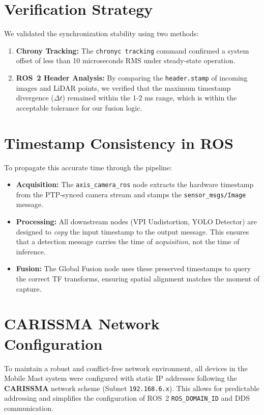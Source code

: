 \documentclass[12pt,a4paper]{report}
\begin{document}
\section{Verification Strategy}
We validated the synchronization stability using two methods:
\begin{enumerate}
    \item \textbf{Chrony Tracking:} The \texttt{chronyc tracking} command confirmed a system offset of less than 10 microseconds RMS under steady-state operation.
    \item \textbf{ROS~2 Header Analysis:} By comparing the \texttt{header.stamp} of incoming images and LiDAR points, we verified that the maximum timestamp divergence ($\Delta t$) remained within the 1-2 ms range, which is within the acceptable tolerance for our fusion logic.
\end{enumerate}

\section{Timestamp Consistency in ROS}
To propagate this accurate time through the pipeline:
\begin{itemize}
    \item \textbf{Acquisition:} The \texttt{axis\_camera\_ros} node extracts the hardware timestamp from the PTP-synced camera stream and stamps the \texttt{sensor\_msgs/Image} message.
    \item \textbf{Processing:} All downstream nodes (VPI Undistortion, YOLO Detector) are designed to \textit{copy} the input timestamp to the output message. This ensures that a detection message carries the time of \textit{acquisition}, not the time of inference.
    \item \textbf{Fusion:} The Global Fusion node uses these preserved timestamps to query the correct TF transforms, ensuring spatial alignment matches the moment of capture.
\end{itemize}

\section{CARISSMA Network Configuration}
To maintain a robust and conflict-free network environment, all devices in the Mobile Mast system were configured with static IP addresses following the \textbf{CARISSMA} network scheme (Subnet \texttt{192.168.6.x}). This allows for predictable addressing and simplifies the configuration of ROS~2 \texttt{ROS\_DOMAIN\_ID} and DDS communication.
\end{document}
